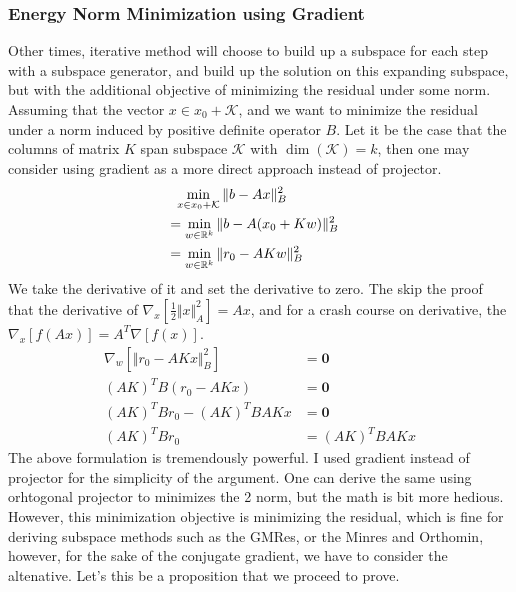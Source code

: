 \documentclass[]{article}
\theoremstyle{definition}
\begin{document}
        \subsubsection{Energy Norm Minimization using Gradient}\label{sec:1.4}
            Other times, iterative method will choose to build up a subspace for each step with a subspace generator, and build up the solution on this expanding subspace, but with the additional objective of minimizing the residual under some norm. Assuming that the vector $x\in x_0 + \mathcal{K}$, and we want to minimize the residual under a norm induced by positive definite operator $B$. Let it be the case that the columns of matrix $K$ span subspace $\mathcal{K}$ with $\dim(\mathcal K) = k$, then one may consider using gradient as a more direct approach instead of projector. 
            \begin{align}
                &\hspace{0.6em} \min_{x\in x_0 + \mathcal{K}} \Vert b - Ax\Vert_B^2 
                \\
                &= \min_{w\in \mathbb{R}^{k}} 
                \Vert b - A(x_0 + Kw)\Vert_B^2 & 
                \\
                &= \min_{w\in \mathbb{R}^{k}} 
                \Vert 
                    r_0 - AKw
                \Vert_B^2
            \end{align}
            We take the derivative of it and set the derivative to zero. The skip the proof that the derivative of $\nabla_x[\frac{1}{2}\Vert x\Vert_A^2] = Ax$, and for a crash course on derivative, the $\nabla_x[f(Ax)] = A^T\nabla [f(x)]$. 
            \begin{align}
                \nabla_w \left[
                    \Vert r_0 - AKx\Vert_B^2
                \right] &= \mathbf{0}
                \\
                (AK)^TB(r_0 - AKx) &= \mathbf{0}
                \\
                (AK)^TBr_0 - (AK)^TBAKx &= \mathbf{0}
                \\
                (AK)^TBr_0 &= (AK)^TBAKx
            \end{align}
            The above formulation is tremendously powerful. I used gradient instead of projector for the simplicity of the argument. One can derive the same using orhtogonal projector to minimizes the 2 norm, but the math is bit more hedious. However, this minimization objective is minimizing the residual, which is fine for deriving subspace methods such as the GMRes, or the Minres and Orthomin, however, for the sake of the conjugate gradient, we have to consider the altenative. Let's this be a proposition that we proceed to prove. 
\end{document}
